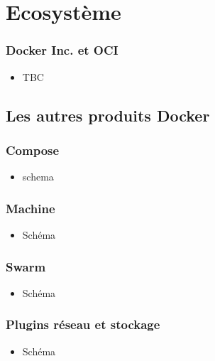   \section[Docker]{Ecosystème}

\begin{frame}
    \frametitle{Docker Inc. et OCI}
    \begin{itemize}
      \item TBC \pause
    \end{itemize}
  \end{frame}


  \subsection[Docker]{Les autres produits Docker}

  \begin{frame}
    \frametitle{Compose}
    \begin{itemize}
      \item schema
    \end{itemize}
  \end{frame}

  \begin{frame}
    \frametitle{Machine}
    \begin{itemize}
      \item Schéma
    \end{itemize}
  \end{frame}

  \begin{frame}
    \frametitle{Swarm}
    \begin{itemize}
      \item Schéma
    \end{itemize}
  \end{frame}

  \begin{frame}
    \frametitle{Plugins réseau et stockage}
    \begin{itemize}
      \item Schéma
    \end{itemize}
  \end{frame}
